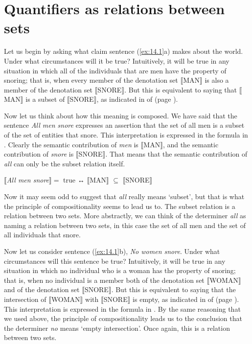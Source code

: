 \section{Quantifiers as relations between sets}\label{sec:14.2}

Let us begin by asking what claim sentence (\ref{ex:14.1}a) makes about the world. Under what circumstances will it be true? Intuitively, it will be true in any situation in which all of the individuals that are men have the property of snoring; that is, when every member of the denotation set $\llbracket$MAN$\rrbracket$  is also a member of the denotation set $\llbracket$SNORE$\rrbracket$. But this is equivalent to saying that $\llbracket$MAN$\rrbracket$  is a subset of $\llbracket$SNORE$\rrbracket$, as indicated in  of  (page \pageref{extab:13.19}).



Now let us think about how this meaning is composed. We have said that the sentence \textit{All men snore} expresses an assertion that the set of all men is a subset of the set of entities that snore. This interpretation is expressed in the formula in . Clearly the semantic contribution of \textit{men} is $\llbracket$MAN$\rrbracket$, and the semantic contribution of \textit{snore} is $\llbracket$SNORE$\rrbracket$. That means that the semantic contribution of \textit{all} can only be the subset relation itself.


\ea \label{ex:14.2}
{}$\llbracket$\textit{All men snore}$\rrbracket =$ true ↔  $\llbracket$MAN$\rrbracket$  ${\subseteq}$ $\llbracket$SNORE$\rrbracket$ 
\z


Now it may seem odd to suggest that \textit{all} really means ‘subset’, but that is what the principle of compositionality seems to lead us to. The subset relation is a relation between two sets. More abstractly, we can think of the determiner \textit{all} as naming a relation between two sets, in this case the set of all men and the set of all individuals that snore.



Now let us consider sentence (\ref{ex:14.1}b), \textit{No women snore}. Under what circumstances will this sentence be true? Intuitively, it will be true in any situation in which no individual who is a woman has the property of snoring; that is, when no individual is a member both of the denotation set $\llbracket$WOMAN$\rrbracket$  and of the denotation set $\llbracket$SNORE$\rrbracket$. But this is equivalent to saying that the intersection of $\llbracket$WOMAN$\rrbracket$  with $\llbracket$SNORE$\rrbracket$  is empty, as indicated in  of  (page \pageref{extab:13.19}). This interpretation is expressed in the formula in . By the same reasoning that we used above, the principle of compositionality leads us to the conclusion that the determiner \textit{no} means ‘empty intersection’. Once again, this is a relation between two sets.


